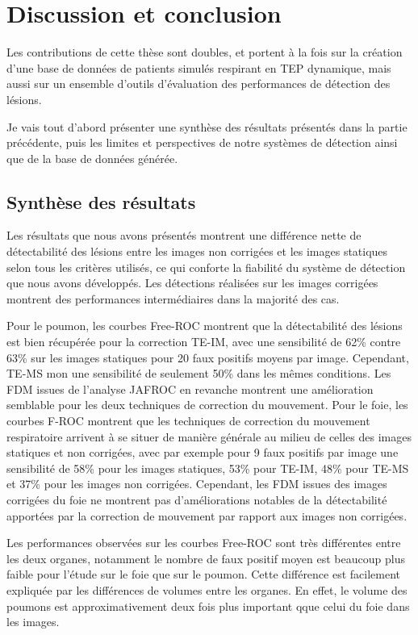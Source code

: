 \chapter{Discussion et conclusion}

Les contributions de cette thèse sont doubles, et portent à la fois sur la
création d'une base de données de patients simulés respirant en TEP dynamique, 
mais aussi sur un ensemble d'outils d'évaluation des performances de détection
des lésions.  
 
Je vais tout d'abord présenter une synthèse des résultats présentés dans la
partie précédente, puis les limites et perspectives de notre systèmes de détection ainsi que de la base de données générée.

\section{Synthèse des résultats}

Les résultats que nous avons présentés montrent une différence nette de
détectabilité des lésions entre les images non corrigées et les images statiques
selon tous les critères utilisés, ce qui conforte la fiabilité du système de
détection que nous avons développés. Les détections réalisées sur les images
corrigées montrent des performances intermédiaires dans la majorité des cas. 

Pour le poumon, les courbes Free-ROC montrent que la détectabilité des
lésions est bien récupérée pour la correction TE-IM, avec une sensibilité de 62\% contre 63\% sur les images statiques pour
20 faux positifs moyens par image. Cependant, TE-MS mon une sensibilité de seulement 50\% dans les mêmes conditions. Les FDM
issues de l'analyse JAFROC en revanche montrent une amélioration semblable pour
les deux techniques de correction du mouvement. Pour le foie, les courbes F-ROC
montrent que les techniques de correction du mouvement respiratoire arrivent à
se situer de manière générale au milieu de celles des images statiques et non
corrigées, avec par exemple pour 9 faux positifs par image une sensibilité de
58\% pour les images statiques, 53\% pour TE-IM, 48\% pour TE-MS et 37\% pour
les images non corrigées. Cependant, les FDM issues des images corrigées du foie
ne montrent pas d'améliorations notables de la détectabilité apportées par la
correction de mouvement par rapport aux images non corrigées. 

Les performances observées sur les courbes Free-ROC sont très différentes
 entre les deux organes, notamment le nombre de faux positif moyen est
beaucoup plus faible pour l'étude sur le foie que sur le poumon. Cette
différence est facilement expliquée par les différences de volumes entre les
organes. En effet, le volume des poumons est approximativement deux fois plus
important qque celui du foie dans les images.

